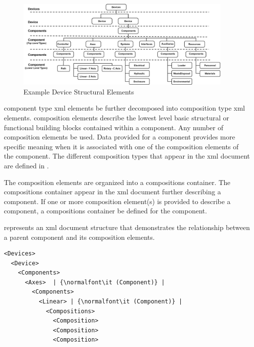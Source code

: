\documentclass{mtconnect}	%
\begin{document}
\begin{figure}[ht]
  \centering
  \includegraphics[width=0.95\textwidth]{figures/devices-structural-elements.png}
  \caption{Example Device Structural Elements}
  \label{fig:mtconnect-devices-structural-elements}
\end{figure}

\FloatBarrier

\gls{component} type \gls{xml} elements \may be further decomposed into \gls{composition} type \gls{xml} elements. \gls{composition} elements describe the lowest level basic structural or functional building blocks contained within a \gls{component}. Any number of \gls{composition} elements \may be used. Data provided for a \gls{component} provides more specific meaning when it is associated with one of the \gls{composition} elements of the \gls{component}.  The different \gls{composition} types that \may appear in the \gls{xml} document are defined in .

The \gls{composition} elements are organized into a \gls{compositions} container.  The \gls{compositions} container \may appear in the \gls{xml} document further describing a \gls{component}. If one or more \gls{composition} element(s) is provided to describe a \gls{component}, a \gls{compositions} container \MUST be defined for the \gls{component}.

 represents an \gls{xml} document structure that demonstrates the relationship between a parent \gls{component} and its \gls{composition} elements.

\begin{lstlisting}[firstnumber=1,escapechar=|,%
    caption={Component levels with Composition},label={lst:component-levels-with-composition}]
<Devices>
  <Device>
    <Components>
      <Axes>  | {\normalfont\it (Component)} |
        <Components>
          <Linear> | {\normalfont\it (Component)} |
            <Compositions>
              <Composition>
              <Composition>
              <Composition>
\end{lstlisting}
\end{document}
